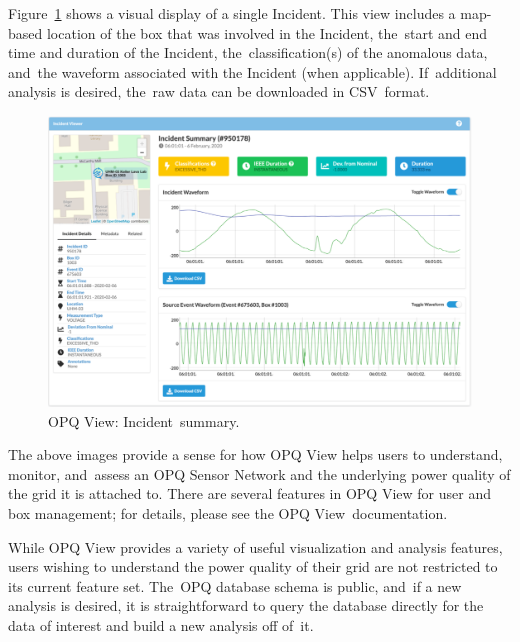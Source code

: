 \documentclass[energies,article,accept,moreauthors,pdftex]{Definitions/mdpi}
\begin{document}
Figure~\ref{fig:opq-view-incident-summary} shows a visual display of a single Incident. This view includes a map-based location of the box that was involved in the Incident, the~start and end time and duration of the Incident, the~classification(s) of the anomalous data, and~the waveform associated with the Incident (when applicable). If~additional analysis is desired, the~raw data can be downloaded in CSV~format.

\begin{figure}[H]
\center \includegraphics[width=5in]{images/view/incident-summary.png}
\caption{OPQ View: Incident~summary.}
\label{fig:opq-view-incident-summary}
\end{figure}

The above images provide a sense for how OPQ View helps users to understand, monitor, and~assess an OPQ Sensor Network and the underlying power quality of the grid it is attached to. There are several features in OPQ View for user and box management; for details, please see the OPQ View~documentation.

While OPQ View provides a variety of useful visualization and analysis features, users wishing to understand the power quality of their grid are not restricted to its current feature set. The~OPQ database schema is public, and~if a new analysis is desired, it is straightforward to query the database directly for the data of interest and build a new analysis off of~it.
\end{document}

